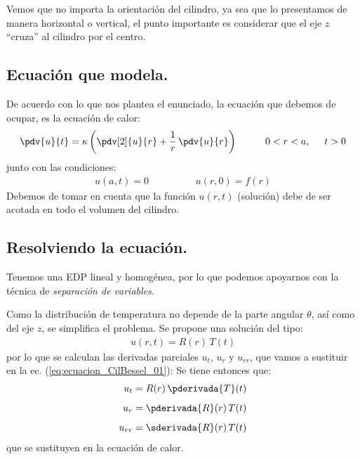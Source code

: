 Vemos que no importa la orientación del cilindro, ya sea que lo presentamos de manera horizontal o vertical, el punto importante es considerar que el eje $z$ \enquote{cruza} al cilindro por el centro.

\subsection{Ecuación que modela.}

De acuerdo con lo que nos plantea el enunciado, la ecuación que debemos de ocupar, es la ecuación de calor:
\begin{align}
\pdv{u}{t} = \kappa \left( \pdv[2]{u}{r} + \dfrac{1}{r}  \, \pdv{u}{r} \right) \hspace{1cm} 0 < r < a, \hspace{0.5cm} t > 0
\label{eq:ecuacion_CilBessel_01}
\end{align}
junto con las condiciones:
\begin{align}
u(a, t) = 0 \hspace{2cm} u(r, 0) = f(r)
\label{eq:ecuacion_CilBessel_02}
\end{align}
Debemos de tomar en cuenta que la función $u(r, t)$ (solución) debe de ser acotada en todo el volumen del cilindro.

\subsection{Resolviendo la ecuación.}

Tenemos una EDP lineal y homogénea, por lo que podemos apoyarnos con la técnica de \emph{separación de variables}.
\par
Como la distribución de temperatura no depende  de la parte angular $\theta$, así como del eje $z$, se simplifica el problema. Se propone una solución del tipo:
\begin{align*}
u(r, t) = R(r) \, T(t)
\end{align*}
por lo que se calculan las derivadas parciales $u_{t}$, $u_{r}$ y $u_{rr}$, que vamos a sustituir en la ec. (\ref{eq:ecuacion_CilBessel_01}):
Se tiene entonces que:
\begin{eqnarray*}
\begin{aligned}
u_{t} &= R(r) \, \pderivada{T}(t) \\[0.5em] 
u_{r} &= \pderivada{R}(r) \, {T}(t) \\[0.5em] 
u_{rr} &= \sderivada{R}(r) \, {T}(t)
\end{aligned}
\end{eqnarray*}
que se sustituyen en la ecuación de calor.

